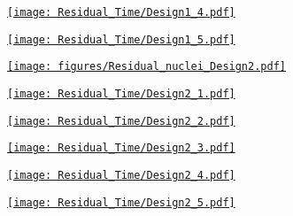 \documentclass[xcolor={dvipsnames}]{beamer}
\begin{document}
\begin{frame}[plain]
 \hypertarget{Residual_nuclei_month_Design1}{\hyperlink{residualtimesprev_Design1}{\texttt{[image: Residual\_Time/Design1\_4.pdf]}}}
\end{frame}
\begin{frame}[plain]
 \hypertarget{Residual_nuclei_year_Design1}{\hyperlink{residualtimesprev_Design1}{\texttt{[image: Residual\_Time/Design1\_5.pdf]}}}
\end{frame}
\begin{frame}[plain]
 \hypertarget{Residual_nuclei_Design2}{\hyperlink{residualtimesprev_Design2}{\texttt{[image: figures/Residual\_nuclei\_Design2.pdf]}}}
\end{frame}
\begin{frame}[plain]
 \hypertarget{Residual_nuclei_minute_Design2}{\hyperlink{residualtimesprev_Design2}{\texttt{[image: Residual\_Time/Design2\_1.pdf]}}}
\end{frame}
\begin{frame}[plain]
 \hypertarget{Residual_nuclei_hour_Design2}{\hyperlink{residualtimesprev_Design2}{\texttt{[image: Residual\_Time/Design2\_2.pdf]}}}
\end{frame}
\begin{frame}[plain]
 \hypertarget{Residual_nuclei_day_Design2}{\hyperlink{residualtimesprev_Design2}{\texttt{[image: Residual\_Time/Design2\_3.pdf]}}}
\end{frame}
\begin{frame}[plain]
 \hypertarget{Residual_nuclei_month_Design2}{\hyperlink{residualtimesprev_Design2}{\texttt{[image: Residual\_Time/Design2\_4.pdf]}}}
\end{frame}
\begin{frame}[plain]
 \hypertarget{Residual_nuclei_year_Design2}{\hyperlink{residualtimesprev_Design2}{\texttt{[image: Residual\_Time/Design2\_5.pdf]}}}
\end{frame}
\end{document}
